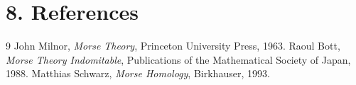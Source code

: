 \section*{8. References}

\begin{thebibliography}{9}
 John Milnor, \emph{Morse Theory}, Princeton University Press, 1963.
 Raoul Bott, \emph{Morse Theory Indomitable}, Publications of the Mathematical Society of Japan, 1988.
 Matthias Schwarz, \emph{Morse Homology}, Birkhauser, 1993.
\end{thebibliography}